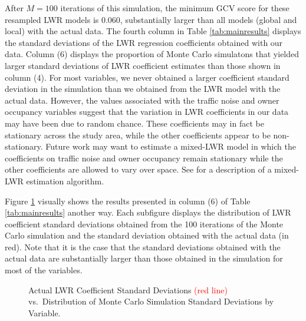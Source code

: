 \documentclass{article}\usepackage{graphicx, color}
\begin{document}
After $M = 100$ iterations of this simulation, the minimum GCV score for these resampled LWR models is 0.060, substantially larger than all models (global and local) with the actual data. The fourth column in Table \ref{tab:mainresults} displays the standard deviations of the LWR regression coefficients obtained with our data. Column (6) displays the proportion of Monte Carlo simulatons that yielded larger standard deviations of LWR coefficient estimates than those shown in column (4). For most variables, we never obtained a larger coefficient standard deviation in the simulation than we obtained from the LWR model with the actual data. However, the values associated with the traffic noise and owner occupancy variables suggest that the variation in LWR coefficients in our data may have been due to random chance. These coefficients may in fact be stationary across the study area, while the other coefficients appear to be non-stationary. Future work may want to estimate a mixed-LWR model in which the coefficients on traffic noise and owner occupancy remain stationary while the other coefficients are allowed to vary over space. See \citet{Fotheringham2002} for a description of a mixed-LWR estimation algorithm. 

Figure \ref{fig:MCsds} visually shows the results presented in column (6) of Table \ref{tab:mainresults} another way. Each subfigure displays the distribution of LWR coefficient standard deviations obtained from the 100 iterations of the Monte Carlo simulation and the standard deviation obtained with the actual data (in red). Note that it is the case that the standard deviations obtained with the actual data are substantially larger than those obtained in the simulation for most of the variables.

\begin{figure}
 \caption{Actual LWR Coefficient Standard Deviations \textcolor{red}{(red line)} vs.\ Distribution of Monte Carlo Simulation Standard Deviations by Variable.}\label{fig:MCsds}
\end{figure}
 
\end{document}
